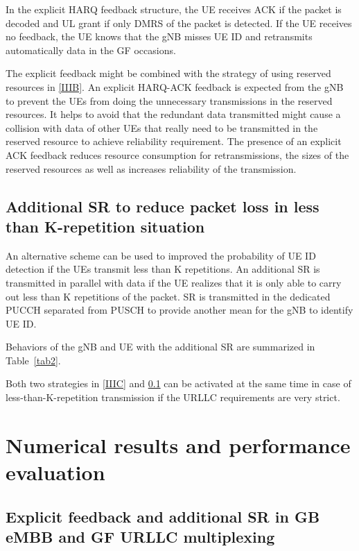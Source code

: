\documentclass{ieeeaccess}
\begin{document}
In the explicit HARQ feedback structure, the UE receives ACK if the packet is decoded and UL grant if only DMRS of the packet is detected. If the UE receives no feedback, the UE knows that the gNB misses UE ID and retransmits automatically data in the GF occasions.

The explicit feedback might be combined with the strategy of using reserved resources in \ref{IIIB}. An explicit HARQ-ACK feedback is expected from the gNB to prevent the UEs from doing the unnecessary transmissions in the reserved resources. It helps to avoid that the redundant data transmitted might cause a collision with data of other UEs that really need to be transmitted in the reserved resource to achieve reliability requirement. The presence of an explicit ACK feedback reduces resource consumption for retransmissions, the sizes of the reserved resources as well as increases reliability of the transmission. 

\subsection{Additional SR to reduce packet loss in less than K-repetition situation}\label{IIID}

An alternative scheme can be used to improved the probability of UE ID detection if the UEs transmit less than K repetitions. An additional SR is transmitted in parallel with data if the UE realizes that it is only able to carry out less than K repetitions of the packet. SR is transmitted in the dedicated PUCCH separated from PUSCH to provide another mean for the gNB to identify UE ID.

Behaviors of the gNB and UE with the additional SR are summarized in Table~\ref{tab2}. 

Both two strategies in \ref{IIIC} and \ref{IIID} can be activated at the same time in case of less-than-K-repetition transmission if the URLLC requirements are very strict.

\section{Numerical results and performance evaluation}
\label{IV}

\subsection{Explicit feedback and additional SR in GB eMBB and GF URLLC multiplexing}
\end{document}
